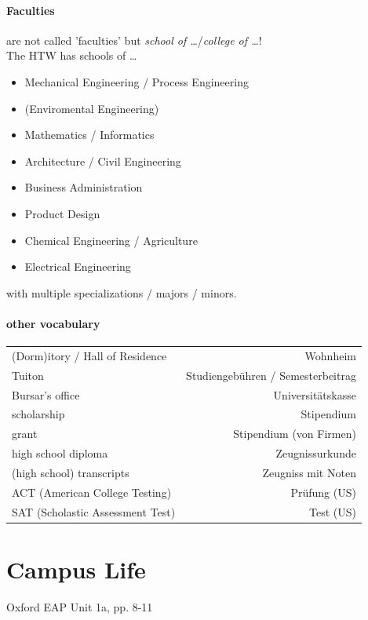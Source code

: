 \paragraph{Faculties} are not called 'faculties' but \emph{school of …}/\emph{college of …}!\\
The HTW has schools of …
\begin{itemize}
\item Mechanical Engineering / Process Engineering
\item (Enviromental Engineering)
\item Mathematics / Informatics
\item Architecture / Civil Engineering
\item Business Administration
\item Product Design
\item Chemical Engineering / Agriculture
\item Electrical Engineering
\end{itemize}
with multiple specializations / majors / minors.

\paragraph{other vocabulary} \parskp
\begin{tabular}{l	r}
(Dorm)itory / Hall of Residence & Wohnheim\\
Tuiton & Studiengebühren / Semesterbeitrag\\
Bursar's office & Universitätskasse\\
scholarship & Stipendium\\
grant & Stipendium (von Firmen)\\
high school diploma & Zeugnissurkunde \\
(high school) transcripts & Zeugniss mit Noten\\
ACT (American College Testing) & Prüfung (US)\\
SAT (Scholastic Assessment Test) & Test (US)
\end{tabular}
\section{Campus Life}
Oxford EAP Unit 1a, pp. 8-11
